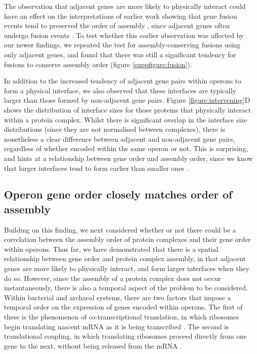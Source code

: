 \documentclass[a4paper,11pt,twoside,openright]{scrbook}
\begin{document}
The observation that adjacent genes are more likely to physically interact could
have an effect on the interpretations of earlier work showing that gene fusion
events tend to preserved the order of assembly \cite{Marsh2013}, since adjacent
genes often undergo fusion events \cite{Pasek2006}. To test whether this earlier
observation was affected by our newer findings, we repeated the test for
assembly-conserving fusions using only adjacent genes, and found that there was
still a significant tendency for fusions to conserve assembly order (figure
\ref{suppfigure:fusion}).

In addition to the increased tendency of adjacent gene pairs within operons to
form a physical interface, we also observed that these interfaces are typically
larger than those formed by non-adjacent gene pairs. Figure
\ref{figure:intervening}D shows the distribution of interface sizes for those
proteins that physically interact within a protein complex. Whilst there is
significant overlap in the interface size distributions (since they are not
normalised between complexes), there is nonetheless a clear difference between
adjacent and non-adjacent gene pairs, regardless of whether encoded within the
same operon or not. This is surprising, and hints at a relationship between gene
order and assembly order, since we know that larger interfaces tend to form
earlier than smaller ones \cite{Levy2008,Marsh2013,Macek2017}.

\subsection{Operon gene order closely matches order of assembly}
Building on this finding, we next considered whether or not there could be a
correlation between the assembly order of protein complexes and their gene order
within operons. Thus far, we have demonstrated that there is a spatial
relationship between gene order and protein complex assembly, in that adjacent
genes are more likely to physically interact, and form larger interfaces when
they do so. However, since the assembly of a protein complex does not occur
instantaneously, there is also a temporal aspect of the problem to be
considered. Within bacterial and archaeal systems, there are two factors that
impose a temporal order on the expression of genes encoded within operons. The
first of these is the phenomenon of co-transcriptional translation, in which
ribosomes begin translating nascent mRNA as it is being transcribed
\cite{Byrne1964,Gowrishankar2004,Kohler2017}. The second is translational
coupling, in which translating ribosomes proceed directly from one gene to the
next, without being released from the mRNA \cite{Oppenheim1980,Levin-Karp2013}.
\end{document}
